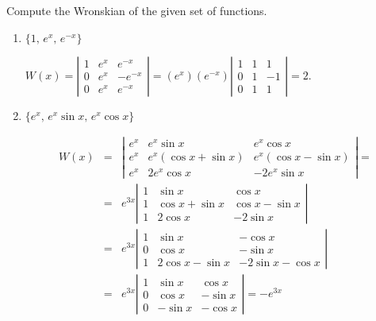 \documentclass{ximera}
\begin{document}
\begin{problem}\label{exer:9.1.10}
Compute the Wronskian of the given set of functions.

\begin{enumerate}
\item  $\{1,\,e^x,\,e^{-x}\}$

\begin{solution}
$W(x)=\left|\begin{array}{ccr}1&e^x&e^{-x}\\0&e^x
&-e^{-x}\\0&e^x&e^{-x}\end{array}\right|=(e^x)(e^{-x})
\left|\begin{array}{ccr}1&1&1\\0&1&-1\\0&1&1\end{array}\right|=2$.
\end{solution}

\item $\{e^x,\, e^x\sin x,\,e^x\cos x\}$

\begin{solution}
\begin{eqnarray*}
W(x)&=&\left|\begin{array}{ccc}e^x&e^x\sin x&e^x\cos x\\e^x&e^x(\cos
x+\sin x)&
e^x(\cos x-\sin x)\\e^x&2e^x\cos x&-2e^x\sin x\end{array}\right|=\\
&=&e^{3x}\left|\begin{array}{ccc}1&\sin x&\cos x\\1&\cos x+\sin x&
\cos x-\sin x\\1&2\cos x&-2\sin x\end{array}\right|\\
&=&e^{3x}\left|\begin{array}{ccc}1&\sin x&-\cos x\\0&\cos x&
-\sin x\\1&2\cos x-\sin x&-2\sin x-\cos x\end{array}\right|\\
&=&e^{3x}\left|\begin{array}{crr}1&\sin x&\cos x\\0&\cos x&
-\sin x\\0&-\sin x&-\cos x\end{array}\right|=-e^{3x}
\end{eqnarray*}
\end{solution}


\end{enumerate}
\end{problem}
\end{document}
